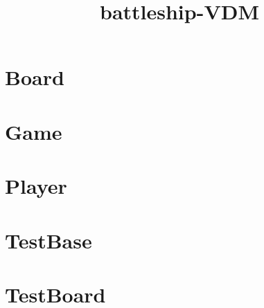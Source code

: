 \documentclass{article}
\begin{document}
\title{battleship-VDM}
\author{}
\maketitle
\tableofcontents

\section{Board}

\section{Game}

\section{Player}

\section{TestBase}

\section{TestBoard}

\end{document}
